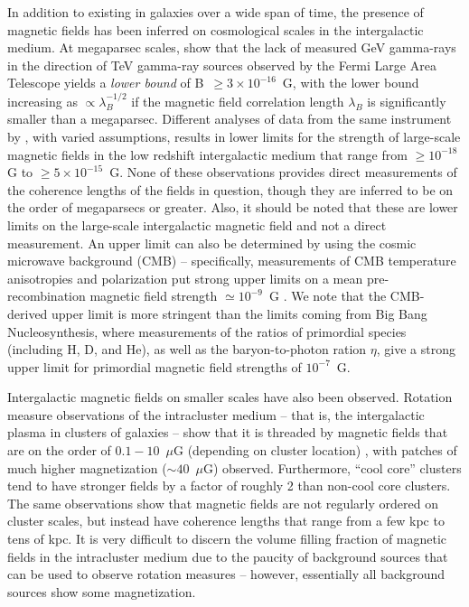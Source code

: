 In addition to existing in galaxies over a wide span of time, the
presence of magnetic fields has been inferred on cosmological scales
in the intergalactic medium.  At megaparsec scales,
\cite{2010Sci...328...73N} show that the lack of measured GeV
gamma-rays in the direction of TeV gamma-ray sources observed by the
Fermi Large Area Telescope yields a \textit{lower bound} of B~$\geq 3
\times 10^{-16}$~G, with the lower bound increasing as $\propto
\lambda_B^{-1/2}$ if the magnetic field correlation length $\lambda_B$
is significantly smaller than a megaparsec.  Different analyses of
data from the same instrument by \cite{2011ApJ...733L..21D,
2010MNRAS.406L..70T}, with varied assumptions, results in lower limits
for the strength of large-scale magnetic fields in the low redshift
intergalactic medium that range from $\geq 10^{-18}$ G to $\geq 5
\times 10^{-15}$~G.  None of these observations provides direct
measurements of the coherence lengths of the fields in question,
though they are inferred to be on the order of megaparsecs or greater.
Also, it should be noted that these are lower limits on the large-scale intergalactic
magnetic field and not a direct measurement.  An upper limit can also be determined by using the
cosmic microwave background (CMB) -- specifically, measurements of CMB
temperature anisotropies and polarization put strong upper limits on a
mean pre-recombination magnetic field strength $\simeq 10^{-9}$~G
\cite{1997PhRvL..78.3610B,2012SSRv..166...37W,2013A&ARv..21...62D}.
We note that the CMB-derived
upper limit is more stringent than the limits
coming from Big Bang Nucleosynthesis, where measurements of the ratios
of primordial species (including H, D, and He), as well as the
baryon-to-photon ration $\eta$, give a strong upper limit for
primordial magnetic field strengths of $10^{-7}$~G.

Intergalactic magnetic fields on smaller scales have also been
observed.  Rotation measure observations of the intracluster medium
-- that is, the intergalactic plasma in clusters of galaxies -- show
that it is threaded by magnetic fields that are on the order of
$0.1-10$~$\mu$G (depending on cluster location)
\cite{Carilli02,2005mpge.conf..231E, 2005A&A...434...67V}, with
patches of much higher magnetization ($\sim 40$~$\mu$G) observed.
Furthermore, ``cool core'' clusters tend to have stronger fields by a
factor of roughly 2 than non-cool core clusters.  The same
observations show that magnetic fields are not regularly ordered on
cluster scales, but instead have coherence lengths that range from a
few kpc to tens of kpc. It is very difficult to discern the volume
filling fraction of magnetic fields in the intracluster medium due to
the paucity of background sources that can be used to observe rotation
measures -- however, essentially all background sources show some
magnetization.

